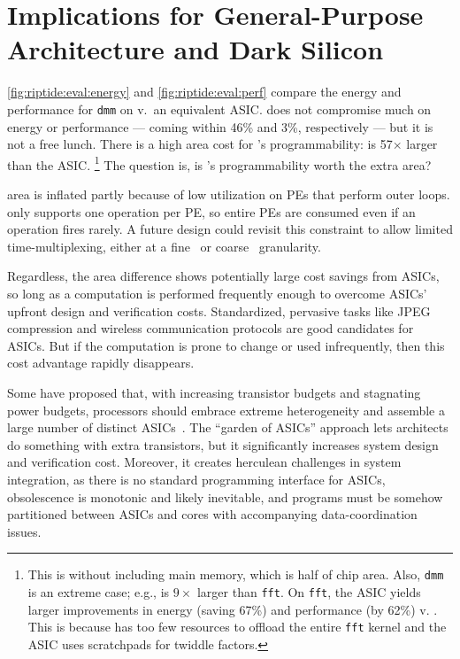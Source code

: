 \section{Implications for General-Purpose Architecture and Dark Silicon}
\label{riptide:implications}

\autoref{fig:riptide:eval:energy} and \autoref{fig:riptide:eval:perf} compare the energy and performance for {\tt dmm} on \riptide v.\ an equivalent ASIC.
%
\riptide does not compromise much on energy or performance --- coming within 46\% and 3\%, respectively --- but it is not a free lunch.
%
There is a high area cost for \riptide's programmability: \riptide is 57$\times$ larger than the ASIC.%
\footnote{This is without including main memory, which is half of chip area. Also, {\tt dmm} is an extreme case; e.g., \riptide is $9\times$ larger than {\tt fft}. On {\tt fft}, the ASIC yields larger improvements in energy (saving 67\%) and performance (by 62\%) v. \riptide. This is because \riptide has too few resources to offload the entire {\tt fft} kernel and the ASIC uses scratchpads for twiddle factors.}
%
The question is, is \riptide's programmability worth the extra area?

\riptide area is inflated partly because of low utilization on PEs that perform outer loops.
%
\riptide only supports one operation per PE, so entire PEs are consumed even if an operation fires rarely.
%
A future design could revisit this constraint to allow limited time-multiplexing,
either at a fine~\cite{weng2020hybrid} or coarse~\cite{nguyen2021fifer} granularity.

Regardless, the area difference shows potentially large cost savings from ASICs,
so long as a computation is performed frequently enough to overcome
ASICs' upfront design and verification costs.
%
Standardized, pervasive tasks like JPEG compression and wireless communication protocols are good candidates for ASICs.
%
But if the computation is prone to change
or used infrequently, then this cost advantage rapidly disappears.

Some have proposed that, with increasing transistor budgets and
stagnating power budgets, processors should embrace extreme
heterogeneity and assemble a large number of distinct
ASICs~\cite{venkatesh2010conservation,taylor2012dark}.
%
The ``garden of ASICs'' approach lets architects do something
with extra transistors, but it significantly increases
system design and verification cost.
%
Moreover, it creates herculean
challenges in system integration,
%
as there is no standard programming interface for ASICs,
obsolescence is monotonic and likely inevitable,
and programs must be somehow partitioned between ASICs
and cores with accompanying data-coordination issues.

